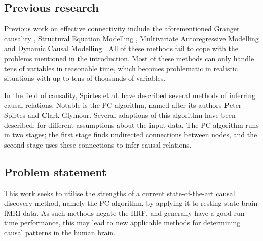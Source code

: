 \documentclass[a4paper, 10pt, english, onecolumn]{article}
\begin{document}
\subsection{Previous research}
Previous work on effective connectivity include the aforementioned Granger causality \cite{roebroeck2005}, Structural Equation Modelling \cite{mclntosh1994}, Multivariate Autoregressive Modelling \cite{harrison2003} and Dynamic Causal Modelling \cite{friston2003}.
All of these methods fail to cope with the problems mentioned in the introduction.
Most of these methods can only handle tens of variables in reasonable time, which becomes problematic in realistic situations with up to tens of thousands of variables.

In the field of causality, Spirtes et al.\cite{spirtes2000} have described several methods of inferring causal relations.
Notable is the PC algorithm, named after its authors \textbf{P}eter Spirtes and \textbf{C}lark Glymour.
Several adaptions of this algorithm have been described, for different assumptions about the input data.
The PC algorithm runs in two stages; the first stage finds undirected connections between nodes, and the second stage uses these connections to infer causal relations.

\subsection{Problem statement}
This work seeks to utilise the strengths of a current state-of-the-art causal discovery method, namely the PC algorithm, by applying it to resting state brain fMRI data.
As such methods negate the HRF, and generally have a good run-time performance, this may lead to new applicable methods for determining causal patterns in the human brain.
\end{document}
